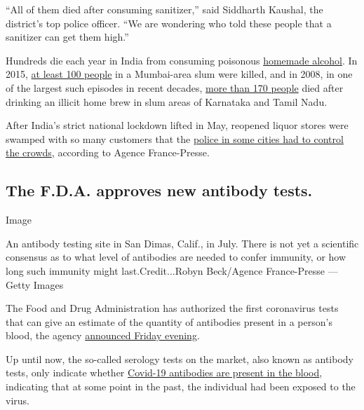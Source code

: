 ``All of them died after consuming sanitizer,'' said Siddharth Kaushal,
the district's top police officer. ``We are wondering who told these
people that a sanitizer can get them high.''

Hundreds die each year in India from consuming poisonous
\href{https://www.nytimes.com/2019/02/11/world/asia/india-toxic-alcohol.html}{homemade
alcohol}. In 2015,
\href{https://www.bbc.com/news/world-asia-india-33224514}{at least 100
people} in a Mumbai-area slum were killed, and in 2008, in one of the
largest such episodes in recent decades,
\href{https://timesofindia.indiatimes.com/city/chennai/TN-hooch-tragedy-21-cops-suspended/articleshow/3159848.cms?referral=PM}{more
than 170 people} died after drinking an illicit home brew in slum areas
of Karnataka and Tamil Nadu.

After India's strict national lockdown lifted in May, reopened liquor
stores were swamped with so many customers that the
\href{https://news.yahoo.com/chaos-outside-liquor-stores-india-eases-virus-lockdown-112326078.html}{police
in some cities had to control the crowds}, according to Agence
France-Presse.

\hypertarget{the-fda-approves-new-antibody-tests}{%
\subsection{The F.D.A. approves new antibody
tests.}\label{the-fda-approves-new-antibody-tests}}

Image

An antibody testing site in San Dimas, Calif., in July. There is not yet
a scientific consensus as to what level of antibodies are needed to
confer immunity, or how long such immunity might last.Credit...Robyn
Beck/Agence France-Presse --- Getty Images

The Food and Drug Administration has authorized the first coronavirus
tests that can give an estimate of the quantity of antibodies present in
a person's blood, the agency
\href{https://www.fda.gov/news-events/press-announcements/coronavirus-covid-19-update-fda-authorizes-first-tests-estimate-patients-antibodies-past-sars-cov-2}{announced
Friday evening}.

Up until now, the so-called serology tests on the market, also known as
antibody tests, only indicate whether
\href{https://www.nytimes.com/2020/07/26/health/coronvirus-antibody-tests.html}{Covid-19
antibodies are present in the blood}, indicating that at some point in
the past, the individual had been exposed to the virus.

